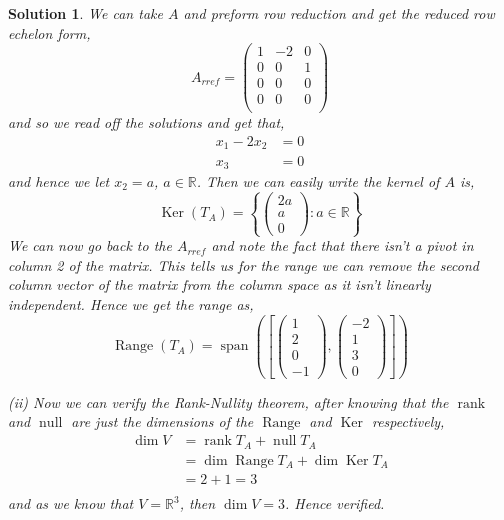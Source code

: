 \documentclass{article}
\renewcommand{\ker}{\operatorname{Ker}}
\newcommand{\range}{\operatorname{Range}}
\newcommand{\Null}{\operatorname{null}}
\newcommand{\R}{\mathbb{R}}
\DeclareMathOperator{\spn}{span}
\DeclareMathOperator{\rank}{rank}
\newtheorem{solution}{Solution}
\begin{document}
\begin{solution}
  We can take $A$ and preform row reduction and get the reduced row echelon form,
  $$ A_{rref} = \begin{pmatrix}
    1 & -2 & 0\\
    0 & 0 & 1 \\
    0 & 0 & 0 \\
    0 & 0 & 0 \\
  \end{pmatrix} $$
  and so we read off the solutions and get that,
  \begin{align*}
    x_1 - 2x_2 &= 0\\
    x_3 &= 0
  \end{align*}
  and hence we let $x_2 = a$, $a \in \R$. Then we can easily write the kernel of $A$ is,
  $$ \ker(T_A) = \left \{ \begin{pmatrix}
    2a \\ a \\ 0
  \end{pmatrix} : a \in \R \right\} $$
  We can now go back to the $A_{rref}$ and note the fact that there isn't a pivot in column 2 of the matrix. This tells us for the range we can remove the second column vector of the matrix from the column space as it isn't linearly independent. Hence we get the range as,
  $$ \range(T_A) = \spn \left(\left[\begin{pmatrix}
    1 \\ 2 \\ 0 \\ -1
  \end{pmatrix}, \begin{pmatrix}
    -2 \\ 1 \\ 3 \\ 0
  \end{pmatrix}\right]\right) $$

  \noindent
  (ii) \quad Now we can verify the Rank-Nullity theorem, after knowing that the $\rank$ and $\Null$ are just the dimensions of the $\range$ and $\ker$ respectively,
  \begin{align*}
    \dim V &= \rank T_A + \Null T_A \\
    &= \dim\range T_A + \dim\ker T_A \\
    &= 2 + 1 = 3\\
  \end{align*}
  and as we know that $V = \R^3$, then $\dim V = 3$. Hence verified.
\end{solution}
\end{document}
